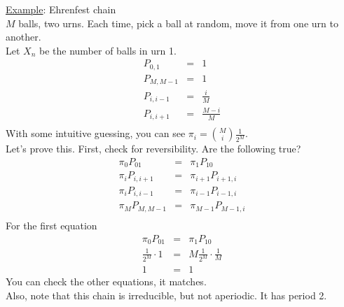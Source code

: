     \noindent \underline{Example}: Ehrenfest chain\\
      $M$ balls, two urns. Each time, pick a ball at random, move it from one urn to
      another.\\
      Let $X_n$ be the number of balls in urn 1.\\
      \begin{eqnarray*}
        P_{0, 1} & = & 1\\
        P_{M, M - 1} & = & 1\\
        P_{i, i - 1} & = & \frac{i}{M}\\
        P_{i, i + 1} & = & \frac{M - i}{M}\\
      \end{eqnarray*}
      With some intuitive guessing, you can see $\pi_i = \binom{M}{i}\frac{1}{2^M}$.\\
      Let's prove this. First, check for reversibility. Are the following true?
      \begin{eqnarray*}
        \pi_0 P_{01} & = & \pi_1 P_{10}\\
        \pi_i P_{i, i+1} & = & \pi_{i + 1} P_{i + 1, i}\\
        \pi_i P_{i, i-1} & = & \pi_{i - 1} P_{i - 1, i}\\
        \pi_M P_{M, M-1} & = & \pi_{M - 1} P_{M - 1, i}\\
      \end{eqnarray*}
      For the first equation
      \begin{eqnarray*}
        \pi_0 P_{01} & = & \pi_1 P_{10}\\
        \frac{1}{2^M} \cdot 1 & = & M \frac{1}{2^M} \cdot \frac{1}{M}\\
        1 & = & 1
      \end{eqnarray*}
      You can check the other equations, it matches.\\
      Also, note that this chain is irreducible, but not aperiodic. It has period 2.

